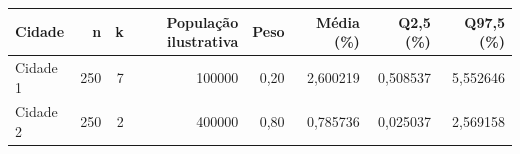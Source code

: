 \begin{tabular}{lrrrrrrr}
\toprule
Cidade & n & k & População ilustrativa & Peso & Média (\%) & Q2,5 (\%) & Q97,5 (\%) \\
\midrule
Cidade 1 & 250 & 7 & 100000 & 0,20 & 2,600219 & 0,508537 & 5,552646 \\
Cidade 2 & 250 & 2 & 400000 & 0,80 & 0,785736 & 0,025037 & 2,569158 \\
\bottomrule
\end{tabular}

